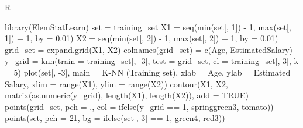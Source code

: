 \documentclass[
]{book}
\newenvironment{Shaded}{\begin{snugshade}}{\end{snugshade}}
\newcommand{\AttributeTok}[1]{\textcolor[rgb]{0.77,0.63,0.00}{#1}}
\newcommand{\ConstantTok}[1]{\textcolor[rgb]{0.00,0.00,0.00}{#1}}
\newcommand{\DecValTok}[1]{\textcolor[rgb]{0.00,0.00,0.81}{#1}}
\newcommand{\FloatTok}[1]{\textcolor[rgb]{0.00,0.00,0.81}{#1}}
\newcommand{\FunctionTok}[1]{\textcolor[rgb]{0.00,0.00,0.00}{#1}}
\newcommand{\NormalTok}[1]{#1}
\newcommand{\OtherTok}[1]{\textcolor[rgb]{0.56,0.35,0.01}{#1}}
\newcommand{\SpecialCharTok}[1]{\textcolor[rgb]{0.00,0.00,0.00}{#1}}
\newcommand{\StringTok}[1]{\textcolor[rgb]{0.31,0.60,0.02}{#1}}
\theoremstyle{definition}
\theoremstyle{definition}
\theoremstyle{definition}
\theoremstyle{definition}
\theoremstyle{remark}
\begin{document}
R

\begin{Shaded}
\begin{Highlighting}[]
\FunctionTok{library}\NormalTok{(ElemStatLearn)}
\NormalTok{set }\OtherTok{=}\NormalTok{ training\_set}
\NormalTok{X1 }\OtherTok{=} \FunctionTok{seq}\NormalTok{(}\FunctionTok{min}\NormalTok{(set[, }\DecValTok{1}\NormalTok{]) }\SpecialCharTok{{-}} \DecValTok{1}\NormalTok{, }\FunctionTok{max}\NormalTok{(set[, }\DecValTok{1}\NormalTok{]) }\SpecialCharTok{+} \DecValTok{1}\NormalTok{, }\AttributeTok{by =} \FloatTok{0.01}\NormalTok{)}
\NormalTok{X2 }\OtherTok{=} \FunctionTok{seq}\NormalTok{(}\FunctionTok{min}\NormalTok{(set[, }\DecValTok{2}\NormalTok{]) }\SpecialCharTok{{-}} \DecValTok{1}\NormalTok{, }\FunctionTok{max}\NormalTok{(set[, }\DecValTok{2}\NormalTok{]) }\SpecialCharTok{+} \DecValTok{1}\NormalTok{, }\AttributeTok{by =} \FloatTok{0.01}\NormalTok{)}
\NormalTok{grid\_set }\OtherTok{=} \FunctionTok{expand.grid}\NormalTok{(X1, X2)}
\FunctionTok{colnames}\NormalTok{(grid\_set) }\OtherTok{=} \FunctionTok{c}\NormalTok{(}\StringTok{\textquotesingle{}Age\textquotesingle{}}\NormalTok{, }\StringTok{\textquotesingle{}EstimatedSalary\textquotesingle{}}\NormalTok{)}
\NormalTok{y\_grid }\OtherTok{=} \FunctionTok{knn}\NormalTok{(}\AttributeTok{train =}\NormalTok{ training\_set[, }\SpecialCharTok{{-}}\DecValTok{3}\NormalTok{], }\AttributeTok{test =}\NormalTok{ grid\_set, }\AttributeTok{cl =}\NormalTok{ training\_set[, }\DecValTok{3}\NormalTok{], }\AttributeTok{k =} \DecValTok{5}\NormalTok{)}
\FunctionTok{plot}\NormalTok{(set[, }\SpecialCharTok{{-}}\DecValTok{3}\NormalTok{],}
     \AttributeTok{main =} \StringTok{\textquotesingle{}K{-}NN (Training set)\textquotesingle{}}\NormalTok{,}
     \AttributeTok{xlab =} \StringTok{\textquotesingle{}Age\textquotesingle{}}\NormalTok{, }\AttributeTok{ylab =} \StringTok{\textquotesingle{}Estimated Salary\textquotesingle{}}\NormalTok{,}
     \AttributeTok{xlim =} \FunctionTok{range}\NormalTok{(X1), }\AttributeTok{ylim =} \FunctionTok{range}\NormalTok{(X2))}
\FunctionTok{contour}\NormalTok{(X1, X2, }\FunctionTok{matrix}\NormalTok{(}\FunctionTok{as.numeric}\NormalTok{(y\_grid), }\FunctionTok{length}\NormalTok{(X1), }\FunctionTok{length}\NormalTok{(X2)), }\AttributeTok{add =} \ConstantTok{TRUE}\NormalTok{)}
\FunctionTok{points}\NormalTok{(grid\_set, }\AttributeTok{pch =} \StringTok{\textquotesingle{}.\textquotesingle{}}\NormalTok{, }\AttributeTok{col =} \FunctionTok{ifelse}\NormalTok{(y\_grid }\SpecialCharTok{==} \DecValTok{1}\NormalTok{, }\StringTok{\textquotesingle{}springgreen3\textquotesingle{}}\NormalTok{, }\StringTok{\textquotesingle{}tomato\textquotesingle{}}\NormalTok{))}
\FunctionTok{points}\NormalTok{(set, }\AttributeTok{pch =} \DecValTok{21}\NormalTok{, }\AttributeTok{bg =} \FunctionTok{ifelse}\NormalTok{(set[, }\DecValTok{3}\NormalTok{] }\SpecialCharTok{==} \DecValTok{1}\NormalTok{, }\StringTok{\textquotesingle{}green4\textquotesingle{}}\NormalTok{, }\StringTok{\textquotesingle{}red3\textquotesingle{}}\NormalTok{))}
\end{Highlighting}
\end{Shaded}
\end{document}
